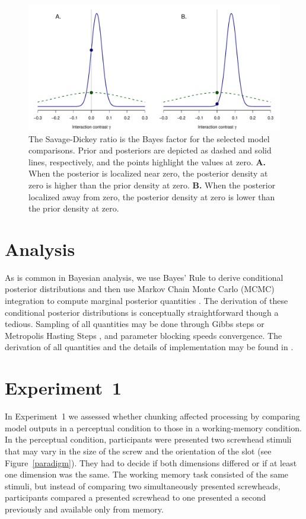 \documentclass[fignum,nobf,man]{apa}
\begin{document}
\begin{figure}
\centering
\includegraphics[width=6in]{savageDickey.pdf}
\caption{The Savage-Dickey ratio is the Bayes factor for the selected model comparisons.  Prior and posteriors are depicted  as dashed and solid lines, respectively, and the points highlight the values at zero.  {\bf A.} When the posterior is localized near zero, the posterior density at zero is higher than the prior density at zero.  {\bf B.}  When the posterior localized away from zero, the posterior density at zero is lower than the prior density at zero.}
\label{ratio}
\end{figure}


\section{Analysis}
As is common in Bayesian analysis, we use Bayes' Rule to derive conditional posterior distributions and then use Markov Chain Monte Carlo (MCMC) integration to compute marginal posterior quantities \citep{Gelman:etal:2004,Rouder:Lu:2005}.  The derivation of these conditional posterior distributions is conceptually straightforward though a tedious.  Sampling of all quantities may be done through Gibbs steps or Metropolis Hasting Steps \citep{Gelfand:Smith:1990}, and parameter blocking \citep{Roberts:Sahu:1997} speeds convergence.  The derivation of all quantities and the details of implementation may be found in \citet{Thiele:2015}.


\section{Experiment~1}
In Experiment~1 we assessed whether chunking affected processing by
comparing model outputs in a perceptual condition to those in a
working-memory condition.  In the perceptual condition, participants
were presented two screwhead stimuli that may vary
in the size of the screw and the orientation of the slot (see Figure~\ref{paradigm}).  They had to
decide if both dimensions differed or if at least one dimension was
the same.  The working memory task consisted of the same stimuli, but
instead of comparing two simultaneously presented screwheads, participants compared a presented screwhead to one presented a second previously and available only from memory.
\end{document}
